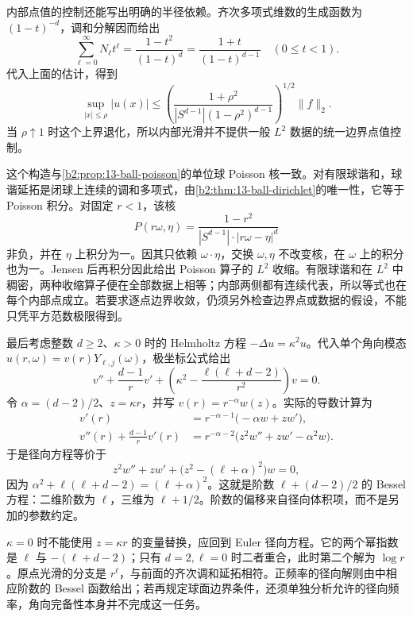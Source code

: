 内部点值的控制还能写出明确的半径依赖。齐次多项式维数的生成函数为 \((1-t)^{-d}\)，调和分解因而给出
\[
 \sum_{\ell=0}^\infty N_\ell t^\ell
       =\frac{1-t^2}{(1-t)^d}
       =\frac{1+t}{(1-t)^{d-1}}
 \quad(0\leq t<1).
\]
代入上面的估计，得到
\[
 \sup_{|x|\leq\rho}|u(x)|
 \leq
 \left(\frac{1+\rho^2}
 {|S^{d-1}|(1-\rho^2)^{d-1}}\right)^{1/2}\|f\|_2.
\]
当 \(\rho\uparrow1\) 时这个上界退化，所以内部光滑并不提供一般 \(L^2\) 数据的统一边界点值控制。

\ProseParagraphBreak

这个构造与\cref{b2:prop:13-ball-poisson}的单位球 Poisson 核一致。对有限球谐和，球谐延拓是闭球上连续的调和多项式，由\cref{b2:thm:13-ball-dirichlet}的唯一性，它等于 Poisson 积分。对固定 \(r<1\)，该核
\[
 P(r\omega,\eta)
       =\frac{1-r^2}{|S^{d-1}|\cdot|r\omega-\eta|^d}
\]
非负，并在 \(\eta\) 上积分为一。因其只依赖
\(\omega\cdot\eta\)，交换 \(\omega,\eta\) 不改变核，在
\(\omega\) 上的积分也为一。Jensen 后再积分因此给出 Poisson 算子的 \(L^2\) 收缩。有限球谐和在 \(L^2\) 中稠密，两种收缩算子便在全部数据上相等；内部两侧都有连续代表，所以等式也在每个内部点成立。若要求逐点边界收敛，仍须另外检查边界点或数据的假设，不能只凭平方范数极限得到。

\ProseParagraphBreak

最后考虑整数 \(d\geq2\)、\(\kappa>0\) 时的 Helmholtz 方程
\(-\Delta u=\kappa^2u\)。代入单个角向模态
\(u(r,\omega)=v(r)Y_{\ell,j}(\omega)\)，极坐标公式给出
\[
 v''+\frac{d-1}rv'
       +\left(\kappa^2-\frac{\ell(\ell+d-2)}{r^2}\right)v=0.
\]
令 \(\alpha=(d-2)/2\)、\(z=\kappa r\)，并写
\(v(r)=r^{-\alpha}w(z)\)。实际的导数计算为
\[
 \begin{aligned}
 v'(r)&=r^{-\alpha-1}\bigl(-\alpha w+zw'\bigr),\\
 v''(r)+\frac{d-1}rv'(r)
 &=r^{-\alpha-2}\bigl(z^2w''+zw'-\alpha^2w\bigr).
 \end{aligned}
\]
于是径向方程等价于
\[
 z^2w''+zw'
       +\bigl(z^2-(\ell+\alpha)^2\bigr)w=0,
\]
因为 \(\alpha^2+\ell(\ell+d-2)=(\ell+\alpha)^2\)。这就是阶数
\(\ell+(d-2)/2\) 的 Bessel 方程：二维阶数为 \(\ell\)，三维为
\(\ell+1/2\)。阶数的偏移来自径向体积项，而不是另加的参数约定。

\ProseParagraphBreak

\(\kappa=0\) 时不能使用 \(z=\kappa r\) 的变量替换，应回到 Euler 径向方程。它的两个幂指数是
\(\ell\) 与 \(-(\ell+d-2)\)；只有 \(d=2,\ell=0\) 时二者重合，此时第二个解为 \(\log r\)。原点光滑的分支是 \(r^\ell\)，与前面的齐次调和延拓相符。正频率的径向解则由中相应阶数的 Bessel 函数给出；若再规定球面边界条件，还须单独分析允许的径向频率，角向完备性本身并不完成这一任务。
